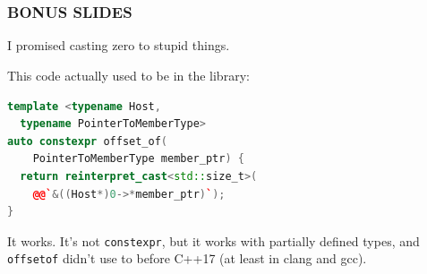 \documentclass{beamer}
\def\code#1{\texttt{#1}}
\newcommand{\nl}{\vspace{0.2\baselineskip}}
\begin{document}
\section{}
\begin{frame}[fragile]
\frametitle{BONUS SLIDES}
\begin{center}
  I promised casting zero to stupid things.\nl\nl
  
  This code actually used to be in the library:
\end{center}

\begin{lstlisting}[language=cpp]
template <typename Host,
  typename PointerToMemberType>
auto constexpr offset_of(
    PointerToMemberType member_ptr) {
  return reinterpret_cast<std::size_t>(
    @@`&((Host*)0->*member_ptr)`);
}
\end{lstlisting}

It works. It's not \code{constexpr}, but it works with partially defined types,
and \code{offsetof} didn't use to before C++17 (at least in clang and gcc).
\end{frame}
\end{document}
